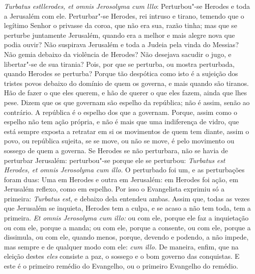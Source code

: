 \emph{Turbatus estllerodes, et omnis Jerosolyma cum lllo}:
Perturbou"-se Herodes e toda a Jerusalém com ele. Perturbar"-se Herodes,
rei intruso e tirano, temendo que o legítimo Senhor o privasse da coroa,
que não era sua, razão tinha; mas que se perturbe juntamente Jerusalém,
quando era a melhor e mais alegre nova que podia ouvir? Não suspirava
Jerusalém e toda a Judeia pela vinda do Messias? Não gemia debaixo da
violência de Herodes? Não desejava sacudir o jugo, e libertar"-se de sua
tirania? Pois, por que se perturba, ou mostra perturbada, quando Herodes
se perturba? Porque tão despótica como isto é a sujeição dos tristes
povos debaixo do domínio de quem os governa, e mais quando são tiranos.
Hão de fazer o que eles querem, e hão de querer o que eles fazem, ainda
que lhes pese. Dizem que os que governam são espelho da república; não é
assim, senão ao contrário. A república é o espelho dos que a governam.
Porque, assim como o espelho não tem ação própria, e não é mais que uma
indiferença de vidro, que está sempre exposta a retratar em si os
movimentos de quem tem diante, assim o povo, ou república sujeita, se se
move, ou não se move, é pelo movimento ou sossego de quem a governa. Se
Herodes se não perturbara, não se havia de perturbar Jerusalém:
perturbou"-se porque ele se perturbou: \emph{Turbatus est Herodes, et
omnis Jerosolyma cum illo.} O perturbado foi um, e as perturbações foram
duas: Uma em Herodes e outra em Jerusalém: em Herodes foi ação, em
Jerusalém reflexo, como em espelho. Por isso o Evangelista exprimiu só a
primeira: \emph{Turbatus est}, e debaixo dela entendeu ambas. Assim
que, todas as vezes que Jerusalém se inquieta, Herodes tem a culpa, e se
acaso a não tem toda, tem a primeira. \emph{Et omnis Jerosolyma cum
illo:} ou com ele, porque ele faz a inquietação ou com ele, porque a
manda; ou com ele, porque a consente, ou com ele, porque a dissimula, ou
com ele, quando menos, porque, devendo e podendo, a não impede, mas
sempre e de qualquer modo com ele: \emph{cum illo.} De maneira, enfim,
que na eleição destes \emph{eles} consiste a paz, o sossego e o bom
governo das conquistas. E este é o primeiro remédio do Evangelho, ou o
primeiro Evangelho do remédio.

